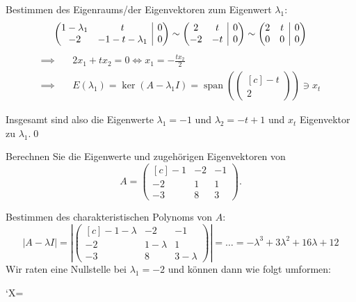 \documentclass[answers]{exam}
\makeatletter
\newenvironment{sysmatrix}[1]
  {\left(\begin{array}{@{}#1@{}}}
  {\end{array}\right)}
\newcommand{\abs}[1]{\left| #1 \right|}
\newcommand{\vektor}[1]{\begin{pmatrix*}[c] #1 \end{pmatrix*}}
\makeatother
\begin{document}
\begin{questions}
\begin{solution}
        Bestimmen des Eigenraums/der Eigenvektoren zum Eigenwert $\lambda_1$:
        $$
            \begin{sysmatrix}{cc|c}
                1-\lambda_1 & t & 0 \\
                -2 & -1-t-\lambda_1 & 0
            \end{sysmatrix}
            \sim
            \begin{sysmatrix}{cc|c}
                2 & t & 0 \\
                -2 & -t & 0
            \end{sysmatrix}
            \sim
            \begin{sysmatrix}{cc|c}
                2 & t & 0 \\
                0 & 0 & 0
            \end{sysmatrix}
        $$
        $$
            \begin{aligned}
                \implies \quad & 2x_1 + tx_2 = 0 \iff x_1 = -\frac{tx_2}{2}                               \\
                \implies \quad & E(\lambda_1) = \ker(A-\lambda_1 I) = \operatorname{span}\left(\vektor{-t \\ 2}\right) \ni x_t
            \end{aligned}
        $$

        Insgesamt sind also die Eigenwerte $\lambda_1 = -1$ und $\lambda_2 = -t+1$ und $x_t$ Eigenvektor zu $\lambda_1$.\qed
    \end{solution}

    \newpage
    \question
    Berechnen Sie die Eigenwerte und zugehörigen Eigenvektoren von
    $$
        A = \vektor{-1 & -2 & -1 \\ -2 & 1 & 1 \\ -3 & 8 & 3}.
    $$
    \begin{solution}
        Bestimmen des charakteristischen Polynoms von $A$:
        $$
            \abs{A - \lambda I} = \abs{\vektor{-1 - \lambda & -2 & -1 \\ -2 & 1 - \lambda & 1 \\ -3 & 8 & 3 - \lambda}} = \ldots = -\lambda^3 + 3 \lambda^2 + 16\lambda + 12
        $$
        Wir raten eine Nullstelle bei $\lambda_1 = -2$ und können dann wie folgt umformen:

        \begin{center}
            \begingroup\mathcode`X=\lambda
            \endgroup
        \end{center}


\end{solution}
\end{questions}
\end{document}
